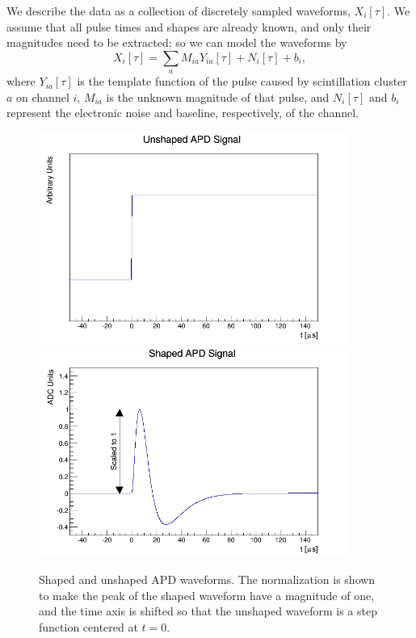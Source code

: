 We describe the data as a collection of discretely sampled waveforms, $X_i[\tau]$.  We assume that all pulse times and shapes are already known, and only their magnitudes need to be extracted; so we can model the waveforms by
\begin{equation}\label{eqn:TimeDomainModelEquation}
X_i[\tau] = \sum_a M_{ia}Y_{ia}[\tau] + N_i[\tau] + b_i,
\end{equation}
where $Y_{ia}[\tau]$ is the template function of the pulse caused by scintillation cluster $a$ on channel $i$, $M_{ia}$ is the unknown magnitude of that pulse, and $N_i[\tau]$ and $b_i$ represent the electronic noise and baseline, respectively, of the channel.

\begin{figure}
\begin{center}
\includegraphics[keepaspectratio=true,width=4in]{scripts/UnshapedAPDWaveform.png}
\includegraphics[keepaspectratio=true,width=4in]{scripts/ShapedAPDWaveform.png}
\end{center}
\renewcommand{\baselinestretch}{1}
\small\normalsize
\begin{quote}
\caption{Shaped and unshaped APD waveforms.  The normalization is shown to make the peak of the shaped waveform have a magnitude of one, and the time axis is shifted so that the unshaped waveform is a step function centered at $t=0$.}
\label{fig:SampleAPDTemplates}
\end{quote}
\end{figure}
\renewcommand{\baselinestretch}{2}
\small\normalsize

